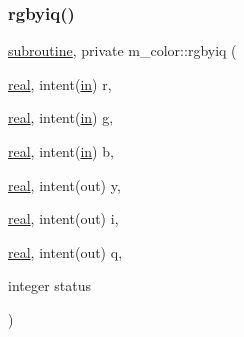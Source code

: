 \subsubsection{\texorpdfstring{rgbyiq()}{rgbyiq()}}
{\footnotesize\ttfamily \hyperlink{M__stopwatch_83_8txt_acfbcff50169d691ff02d4a123ed70482}{subroutine}, private m\+\_\+color\+::rgbyiq (\begin{DoxyParamCaption}\item[{\hyperlink{read__watch_83_8txt_abdb62bde002f38ef75f810d3a905a823}{real}, intent(\hyperlink{M__journal_83_8txt_afce72651d1eed785a2132bee863b2f38}{in})}]{r,  }\item[{\hyperlink{read__watch_83_8txt_abdb62bde002f38ef75f810d3a905a823}{real}, intent(\hyperlink{M__journal_83_8txt_afce72651d1eed785a2132bee863b2f38}{in})}]{g,  }\item[{\hyperlink{read__watch_83_8txt_abdb62bde002f38ef75f810d3a905a823}{real}, intent(\hyperlink{M__journal_83_8txt_afce72651d1eed785a2132bee863b2f38}{in})}]{b,  }\item[{\hyperlink{read__watch_83_8txt_abdb62bde002f38ef75f810d3a905a823}{real}, intent(out)}]{y,  }\item[{\hyperlink{read__watch_83_8txt_abdb62bde002f38ef75f810d3a905a823}{real}, intent(out)}]{i,  }\item[{\hyperlink{read__watch_83_8txt_abdb62bde002f38ef75f810d3a905a823}{real}, intent(out)}]{q,  }\item[{integer}]{status }\end{DoxyParamCaption})\hspace{0.3cm}{\ttfamily [private]}}


